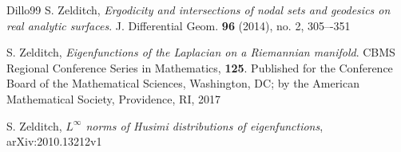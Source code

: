 \documentclass[12pt,a4paper]{article}
\theoremstyle{plain}
\theoremstyle{definition}
\begin{document}
\begin{thebibliography}{Dillo99}
 S. Zelditch, {\em Ergodicity and intersections of nodal sets and geodesics on real analytic surfaces}. J. Differential Geom. \textbf{96} (2014), no. 2, 305–-351

 S. Zelditch, {\em Eigenfunctions of the Laplacian on a Riemannian manifold}. CBMS Regional Conference Series in Mathematics, 
\textbf{125}. Published for the Conference Board of the Mathematical Sciences, Washington, DC; by the American Mathematical Society, Providence, RI, 2017

 S. Zelditch, {\em 
$L^\infty$ norms of Husimi distributions of eigenfunctions},
arXiv:2010.13212v1 

%




\end{thebibliography}
\end{document}
